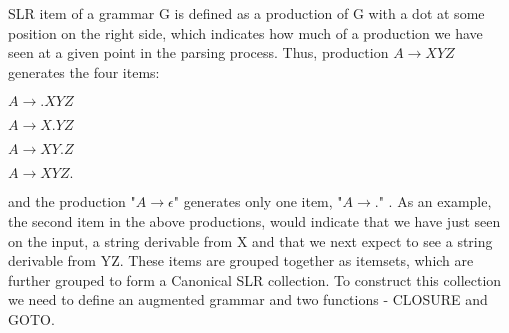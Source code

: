 SLR item of a grammar G is defined as a production of G with a dot at some position on the right side, which indicates how much of a production we have seen at a given point in the parsing process. Thus, production $A\rightarrow XYZ$ generates the four items:

$A\rightarrow .XYZ$

$A\rightarrow X.YZ$

$A\rightarrow XY.Z$

$A\rightarrow XYZ.$

and the production "$A\rightarrow \epsilon$" generates only one item, "$A\rightarrow.$" . As an example, the second item in the above productions, would indicate that we have just seen on the input, a string derivable from X and that we next expect to see a string derivable from YZ. These items are grouped together as itemsets, which are further grouped to form a Canonical SLR collection. To construct this collection we need to define an augmented grammar and two functions - CLOSURE and GOTO.

